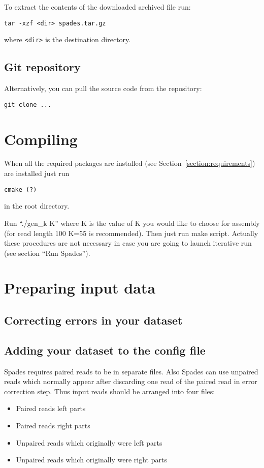 \documentclass{article}
\begin{document}
To extract the contents of the downloaded archived file run:
\begin{lstlisting}
tar -xzf <dir> spades.tar.gz
\end{lstlisting}
where {\tt <dir>} is the destination directory.

\subsection{Git repository}
Alternatively, you can pull the source code from the 
repository:
\begin{lstlisting}
git clone ...
\end{lstlisting}


\section{Compiling}
When all the required packages are installed (see 
Section~\ref{section:requirements}) are installed
just run
\begin{lstlisting}
cmake (?)
\end{lstlisting}
in the root directory.

Run ``./gen\_k K'' where K is the value of K you would like to choose for assembly (for read length 100 K=55 is recommended).
Then just run make script.
Actually these procedures are not necessary in case you are going to launch iterative run (see section ``Run Spades'').


\section{Preparing input data}
\subsection{Correcting errors in your dataset}

\subsection{Adding your dataset to the config file}
Spades requires paired reads to be in separate files.
Also Spades can use unpaired reads which normally appear after discarding one read of the paired read in error correction step.
Thus input reads should be arranged into four files:
\begin{itemize}
 \item Paired reads left parts
 \item Paired reads right parts
 \item Unpaired reads which originally were left parts
 \item Unpaired reads which originally were right parts
\end{itemize}
\end{document}
